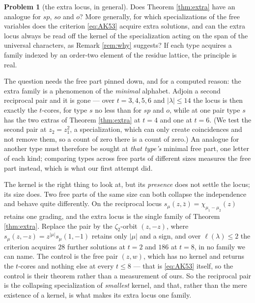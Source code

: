 \documentclass[11pt,reqno]{amsart}
\theoremstyle{plain}
\theoremstyle{definition}
\newtheorem{problem}[theorem]{Problem}
\newcommand{\zb}{\bar z}
\begin{document}
\begin{problem}[the extra locus, in general]\label{prob:extralocus}
Does Theorem \ref{thm:extra} have an analogue for $sp$, $so$ and $o$? More generally, for which
specializations of the free variables does the criterion \eqref{eq:AK53} acquire extra solutions, and
can the extra locus always be read off the kernel of the specialization acting on the span of the
universal characters, as Remark \ref{rem:why} suggests? If each type acquires a family indexed by an
order-two element of the residue lattice, the principle is real.

The question needs the free part pinned down, and for a computed reason: the extra family is a
phenomenon of the \emph{minimal} alphabet. Adjoin a second reciprocal pair and it is gone --- over
$t=3,4,5,6$ and $|\lambda|\le14$ the locus is then exactly the $t$-cores, for type $s$ no less than
for $sp$ and $o$, while at one pair type $s$ has the two extras of Theorem \ref{thm:extra} at $t=4$
and one at $t=6$. (We test the second pair at $z_2=z_1^{2}$, a specialization, which can only create
coincidences and not remove them, so a count of zero there is a count of zero.) An analogue for
another type must therefore be sought at \emph{that type's} minimal free part, one letter of each
kind; comparing types across free parts of different sizes measures the free part instead, which is
what our first attempt did.

The kernel is the right thing to look at, but its \emph{presence} does not settle the locus; its
size does. Two free parts of the same size can both collapse the independence and behave quite
differently. On the reciprocal locus $s_\mu(z,\zb)=\chi_{\mu_1-\mu_2}(z)$ retains one grading, and
the extra locus is the single family of Theorem \ref{thm:extra}. Replace the pair by the
$\zeta_2$-orbit $(z,-z)$, where $s_\mu(z,-z)=z^{|\mu|}s_\mu(1,-1)$ retains only $|\mu|$ and a sign,
and over $\ell(\lambda)\le2$ the criterion acquires $28$ further solutions at $t=2$ and $186$ at
$t=8$, in no family we can name. The control is the free pair $(z,w)$, which has no kernel and
returns the $t$-cores and nothing else at every $t\le8$ --- that is \eqref{eq:AK53} itself, so the
control is their theorem rather than a measurement of ours. So the
reciprocal pair is the collapsing specialization of \emph{smallest} kernel, and that, rather than
the mere existence of a kernel, is what makes its extra locus one family.
\end{problem}
\end{document}
